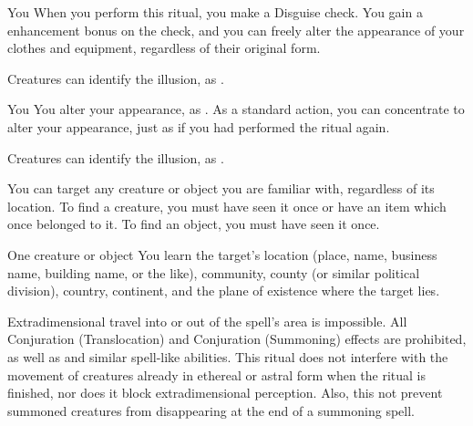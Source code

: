 \spelldur{\durlong \dismissable}
\begin{spelltarget}{You}
    \spelleffect When you perform this ritual, you make a Disguise check. You gain a  enhancement bonus on the check, and you can freely alter the appearance of your clothes and equipment, regardless of their original form.
\end{spelltarget}
\spellnotes Creatures can identify the illusion, as .

\spelldur{\durext \dismissable}
\begin{spelltarget}{You}
    \spelleffect You alter your appearance, as . As a standard action, you can concentrate to alter your appearance, just as if you had performed the  ritual again.
\end{spelltarget}
\spellnotes Creatures can identify the illusion, as .

\spellspecial You can target any creature or object you are familiar with, regardless of its location. To find a creature, you must have seen it once or have an item which once belonged to it. To find an object, you must have seen it once.
\begin{spelltarget}{One creature or object}
    \spelleffect You learn the target's location (place, name, business name, building name, or the like), community, county (or similar political division), country, continent, and the plane of existence where the target lies.
\end{spelltarget}

\spellline
\spelleffect Extradimensional travel into or out of the spell's area is impossible. All Conjuration (Translocation) and Conjuration (Summoning) effects are prohibited, as well as  and similar spell-like abilities.
\spellnotes This ritual does not interfere with the movement of creatures already in ethereal or astral form when the ritual is finished, nor does it block extradimensional perception. Also, this not prevent summoned creatures from disappearing at the end of a summoning spell.

